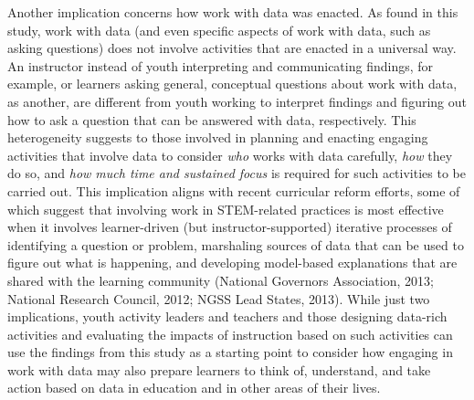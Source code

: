 \documentclass[]{msu-thesis}
\theoremstyle{definition}
\theoremstyle{definition}
\theoremstyle{definition}
\theoremstyle{remark}
\begin{document}
Another implication concerns how work with data was enacted. As found in
this study, work with data (and even specific aspects of work with data,
such as asking questions) does not involve activities that are enacted
in a universal way. An instructor instead of youth interpreting and
communicating findings, for example, or learners asking general,
conceptual questions about work with data, as another, are different
from youth working to interpret findings and figuring out how to ask a
question that can be answered with data, respectively. This
heterogeneity suggests to those involved in planning and enacting
engaging activities that involve data to consider \emph{who} works with
data carefully, \emph{how} they do so, and \emph{how much time and
sustained focus} is required for such activities to be carried out. This
implication aligns with recent curricular reform efforts, some of which
suggest that involving work in STEM-related practices is most effective
when it involves learner-driven (but instructor-supported) iterative
processes of identifying a question or problem, marshaling sources of
data that can be used to figure out what is happening, and developing
model-based explanations that are shared with the learning community
(National Governors Association, 2013; National Research Council, 2012;
NGSS Lead States, 2013). While just two implications, youth activity
leaders and teachers and those designing data-rich activities and
evaluating the impacts of instruction based on such activities can use
the findings from this study as a starting point to consider how
engaging in work with data may also prepare learners to think of,
understand, and take action based on data in education and in other
areas of their lives.
\end{document}
